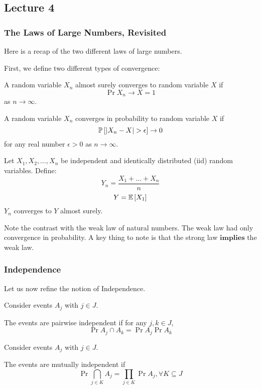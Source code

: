\subsection{Lecture 4}

\subsubsection{The Laws of Large Numbers, Revisited}
Here is a recap of the two different laws of large numbers.

First, we define two different types of convergence:
\begin{definition} 
    A random variable $X_n$ almost surely converges to random variable $X$ if
    \[\Pr{X_n \to X} = 1 \]
    as $n \to \infty$.
\end{definition}

\begin{definition}
    A random variable $X_n$ converges in probability to random variable $X$ if
    \[ \mathbb{P}\left[ \abs{X_n - X} > \epsilon \right] \to 0 \]
    for any real number $\epsilon > 0$ as $n \to \infty$.
\end{definition}

\begin{theorem} 
    Let $X_1, X_2, \dots, X_n$ be independent and identically distributed (iid)
    random variables. Define:
    \[ Y_n = \frac{X_1 + \dots + X_n}{n} \]
    \[ Y = \mathbb{E}\left[ X_1 \right] \]
    $Y_n$ converges to $Y$ almost surely.
\end{theorem}

Note the contrast with the weak law of natural numbers. The weak law had only convergence in probability.
A key thing to note is that the strong law $\textbf{implies}$ the weak law.

\subsubsection{Independence}
Let us now refine the notion of Independence.

\begin{definition} 
    Consider events $A_j$ with $j \in J$.

    The events are pairwise independent if for any $j, k \in J$,
    \[\Pr{A_j \cap A_k} = \Pr{A_j} \Pr{A_k}\]
\end{definition}

\begin{definition} 
    Consider events $A_j$ with $j \in J$.

    The events are mutually independent if 
    \[\Pr{\bigcap_{j \in K} A_j} = \prod_{j \in K} \Pr{A_j}, \forall K \subseteq J \]
\end{definition}

